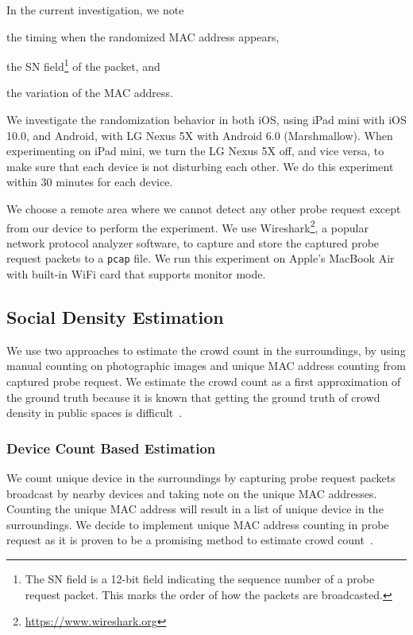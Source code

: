 In the current investigation, we note 
\begin{enumerate*}[label={\alph*)},font={\color{red!50!black}\bfseries}]
  \item the timing when the randomized MAC address appears,
  \item the \ac{SN} field\footnote{The \ac{SN} field is a 12-bit field indicating the sequence number of a probe request packet. This marks the order of how the packets are broadcasted.} of the packet, and
  \item the variation of the \ac{MAC} address.
\end{enumerate*}

We investigate the randomization behavior in both iOS, using iPad mini with iOS 10.0, and Android, with LG Nexus 5X with Android 6.0 (Marshmallow). When experimenting on iPad mini, we turn the LG Nexus 5X off, and vice versa, to make sure that each device is not disturbing each other. We do this experiment within 30 minutes for each device.

We choose a remote area where we cannot detect any other probe request except from our device to perform the experiment. We use Wireshark\footnote{\url{https://www.wireshark.org}}, a popular network protocol analyzer software, to capture and store the captured probe request packets to a \verb|pcap| file. We run this experiment on Apple's MacBook Air with built-in WiFi card that supports monitor mode.

\subsection{Social Density Estimation} %
\label{sub:social_density_estimation}
We use two approaches to estimate the crowd count in the surroundings, by using manual counting on photographic images and unique \ac{MAC} address counting from captured probe request. We estimate the crowd count as a first approximation of the ground truth because it is known that getting the ground truth of crowd density in public spaces is difficult~\cite{thesis041}.

	\subsubsection{Device Count Based Estimation} %
	\label{ssub:probe_request_based_estimation}
	We count unique device in the surroundings by capturing probe request packets broadcast by nearby devices and taking note on the unique \ac{MAC} addresses. Counting the unique \ac{MAC} address will result in a list of unique device in the surroundings. We decide to implement unique \ac{MAC} address counting in probe request as it is proven to be a promising method to estimate crowd count~\cite{thesis047}.

